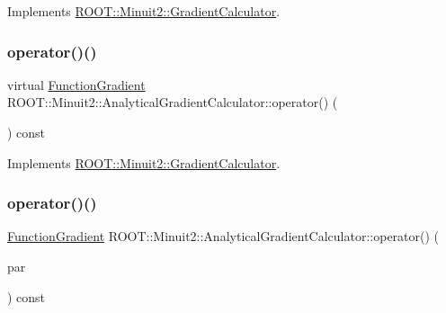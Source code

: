 Implements \mbox{\hyperlink{classROOT_1_1Minuit2_1_1GradientCalculator_a1bae913e96ffc9ece28664a5f6f79cb0}{R\+O\+O\+T\+::\+Minuit2\+::\+Gradient\+Calculator}}.

\mbox{\label{classROOT_1_1Minuit2_1_1AnalyticalGradientCalculator_a711ef74b01726ca7081031998c44d81b}} 
\subsubsection{\texorpdfstring{operator()()}{operator()()}\hspace{0.1cm}{\footnotesize\ttfamily [2/6]}}
{\footnotesize\ttfamily virtual \mbox{\hyperlink{classROOT_1_1Minuit2_1_1FunctionGradient}{Function\+Gradient}} R\+O\+O\+T\+::\+Minuit2\+::\+Analytical\+Gradient\+Calculator\+::operator() (\begin{DoxyParamCaption}\item[{const \mbox{\hyperlink{classROOT_1_1Minuit2_1_1MinimumParameters}{Minimum\+Parameters}} \&}]{ }\end{DoxyParamCaption}) const\hspace{0.3cm}{\ttfamily [virtual]}}



Implements \mbox{\hyperlink{classROOT_1_1Minuit2_1_1GradientCalculator_a1bae913e96ffc9ece28664a5f6f79cb0}{R\+O\+O\+T\+::\+Minuit2\+::\+Gradient\+Calculator}}.

\mbox{\label{classROOT_1_1Minuit2_1_1AnalyticalGradientCalculator_aff4787568d15aaf6dac1c8ffa1bd9db7}} 
\subsubsection{\texorpdfstring{operator()()}{operator()()}\hspace{0.1cm}{\footnotesize\ttfamily [3/6]}}
{\footnotesize\ttfamily \mbox{\hyperlink{classROOT_1_1Minuit2_1_1FunctionGradient}{Function\+Gradient}} R\+O\+O\+T\+::\+Minuit2\+::\+Analytical\+Gradient\+Calculator\+::operator() (\begin{DoxyParamCaption}\item[{const \mbox{\hyperlink{classROOT_1_1Minuit2_1_1MinimumParameters}{Minimum\+Parameters}} \&}]{par }\end{DoxyParamCaption}) const\hspace{0.3cm}{\ttfamily [virtual]}}




